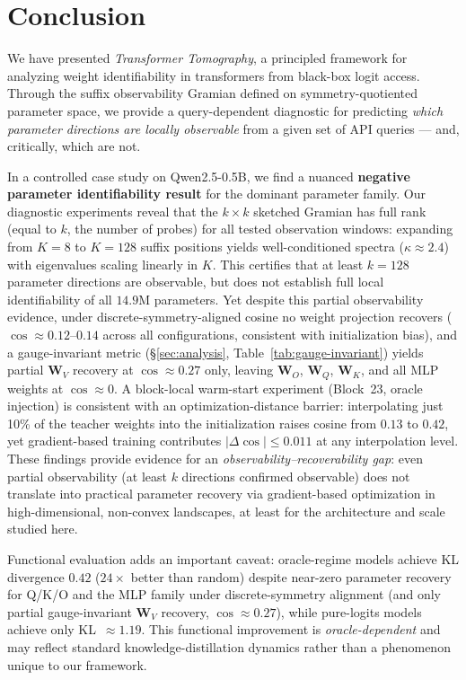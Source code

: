 \documentclass{article}
\newcommand{\bW}{\mathbf{W}}
\begin{document}
\section{Conclusion}
\label{sec:conclusion}

We have presented \emph{Transformer Tomography}, a principled framework for analyzing weight identifiability in transformers from black-box logit access.  Through the suffix observability Gramian defined on symmetry-quotiented parameter space, we provide a query-dependent diagnostic for predicting \emph{which parameter directions are locally observable} from a given set of API queries --- and, critically, which are not.

In a controlled case study on Qwen2.5-0.5B, we find a nuanced \textbf{negative parameter identifiability result} for the dominant parameter family.  Our diagnostic experiments reveal that the $k \times k$ sketched Gramian has full rank (equal to $k$, the number of probes) for all tested observation windows: expanding from $K{=}8$ to $K{=}128$ suffix positions yields well-conditioned spectra ($\kappa \approx 2.4$) with eigenvalues scaling linearly in $K$.  This certifies that at least $k = 128$ parameter directions are observable, but does not establish full local identifiability of all $14.9\text{M}$ parameters.  Yet despite this partial observability evidence, under discrete-symmetry-aligned cosine no weight projection recovers ($\cos \approx 0.12$--$0.14$ across all configurations, consistent with initialization bias), and a gauge-invariant metric (\S\ref{sec:analysis}, Table~\ref{tab:gauge-invariant}) yields partial $\bW_V$ recovery at $\cos \approx 0.27$ only, leaving $\bW_O$, $\bW_Q$, $\bW_K$, and all MLP weights at $\cos \approx 0$.  A block-local warm-start experiment (Block~23, oracle injection) is consistent with an optimization-distance barrier: interpolating just 10\% of the teacher weights into the initialization raises cosine from $0.13$ to $0.42$, yet gradient-based training contributes $|\Delta\cos| \leq 0.011$ at any interpolation level.  These findings provide evidence for an \emph{observability--recoverability gap}: even partial observability (at least $k$ directions confirmed observable) does not translate into practical parameter recovery via gradient-based optimization in high-dimensional, non-convex landscapes, at least for the architecture and scale studied here.

Functional evaluation adds an important caveat: oracle-regime models achieve KL divergence $0.42$ ($24\times$ better than random) despite near-zero parameter recovery for Q/K/O and the MLP family under discrete-symmetry alignment (and only partial gauge-invariant $\bW_V$ recovery, $\cos \approx 0.27$), while pure-logits models achieve only KL~$\approx 1.19$.  This functional improvement is \emph{oracle-dependent} and may reflect standard knowledge-distillation dynamics rather than a phenomenon unique to our framework.
\end{document}
